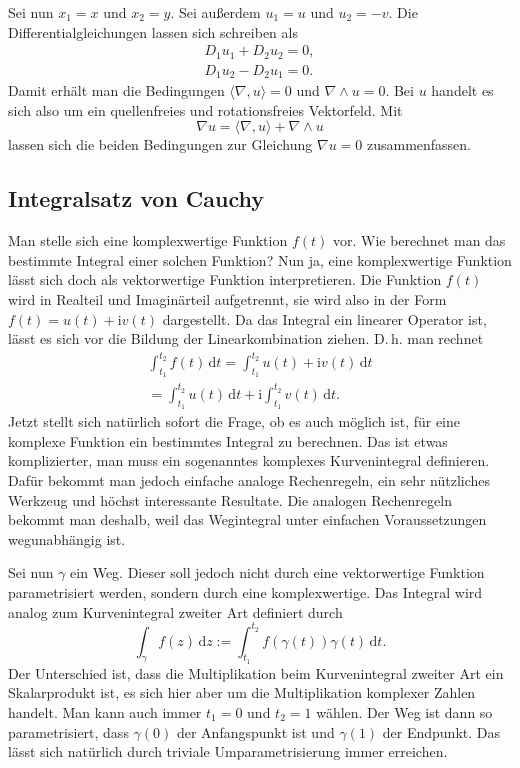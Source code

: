 \documentclass[a4paper,10pt,fleqn,twocolumn,twoside]{article}
\numberwithin{equation}{section}
\newcommand{\ui}{\mathrm i}
\begin{document}
Sei nun $x_1=x$ und $x_2=y$. Sei außerdem $u_1=u$
und $u_2=-v$. Die Differentialgleichungen lassen sich schreiben als
\begin{gather*}
D_1u_1+D_2u_2=0,\\
D_1u_2-D_2u_1=0.
\end{gather*}
Damit erhält man die Bedingungen $\langle\nabla,u\rangle=0$ und
$\nabla\wedge u=0$. Bei $u$ handelt es sich also um ein
quellenfreies und rotationsfreies Vektorfeld. Mit
\begin{equation}
\nabla u = \langle\nabla, u\rangle+\nabla\wedge u
\end{equation}
lassen sich die beiden Bedingungen zur Gleichung $\nabla u=0$
zusammenfassen.

\subsection{Integralsatz von Cauchy}

Man stelle sich eine komplexwertige Funktion $f(t)$ vor.
Wie berechnet man das bestimmte Integral einer solchen Funktion?
Nun ja, eine komplexwertige Funktion lässt sich doch als vektorwertige
Funktion interpretieren. Die Funktion $f(t)$ wird in Realteil und
Imaginärteil aufgetrennt, sie wird also in der Form
$f(t)=u(t)+\ui v(t)$ dargestellt.
Da das Integral ein linearer Operator ist,
lässt es sich vor die Bildung der Linearkombination ziehen.
D.\,h. man rechnet
\begin{gather*}
\int_{t_1}^{t_2} f(t)\,\mathrm dt
= \int_{t_1}^{t_2} u(t)+\ui v(t)\,\mathrm dt\\
= \int_{t_1}^{t_2} u(t)\,\mathrm dt + \ui\int_{t_1}^{t_2}
v(t)\,\mathrm dt.
\end{gather*}
Jetzt stellt sich natürlich sofort die Frage, ob es auch möglich ist,
für eine komplexe Funktion ein bestimmtes Integral zu berechnen.
Das ist etwas komplizierter, man muss ein sogenanntes komplexes
Kurvenintegral definieren. Dafür bekommt man jedoch einfache analoge
Rechenregeln, ein sehr nützliches Werkzeug und höchst interessante
Resultate. Die analogen Rechenregeln bekommt man deshalb,
weil das Wegintegral unter einfachen Voraussetzungen
wegunabhängig ist.

Sei nun $\gamma$ ein Weg. Dieser soll jedoch nicht durch eine
vektorwertige Funktion parametrisiert werden, sondern durch
eine komplexwertige. Das Integral wird analog zum Kurvenintegral
zweiter Art definiert durch
\begin{equation}
\int_\gamma f(z)\,\mathrm dz
:= \int_{t_1}^{t_2} f(\gamma(t))\gamma(t)\,\mathrm dt.
\end{equation}
Der Unterschied ist, dass die Multiplikation beim Kurvenintegral
zweiter Art ein Skalarprodukt ist, es sich hier aber um die
Multiplikation komplexer Zahlen handelt.
Man kann auch immer $t_1=0$ und $t_2=1$ wählen.
Der Weg ist dann so parametrisiert, dass $\gamma(0)$
der Anfangspunkt ist und $\gamma(1)$ der Endpunkt. Das lässt
sich natürlich durch triviale Umparametrisierung immer erreichen.
\end{document}

